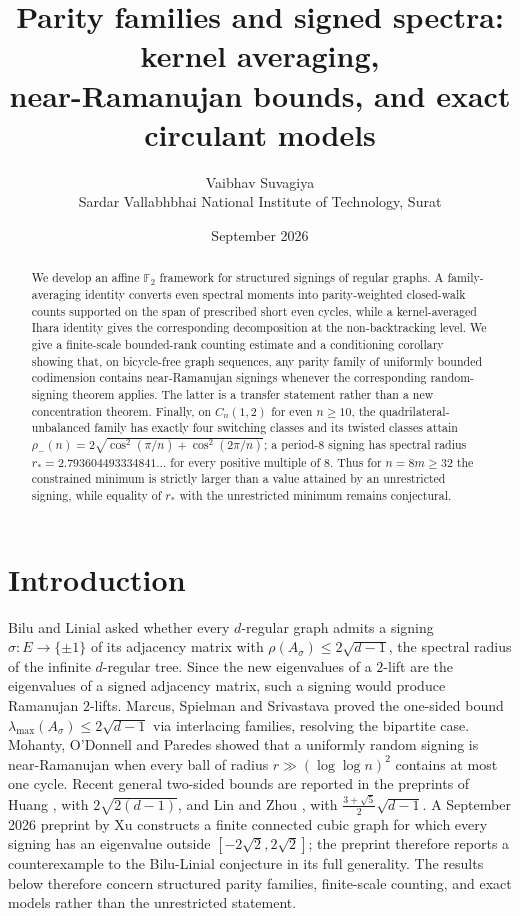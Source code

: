 \documentclass[11pt]{article}
\title{Parity families and signed spectra: kernel averaging,\\ near-Ramanujan bounds, and exact circulant models}
\author{Vaibhav Suvagiya\\
\small Sardar Vallabhbhai National Institute of Technology, Surat}
\date{September 2026}
\theoremstyle{remark}
\begin{document}
\maketitle

\begin{abstract}
We develop an affine $\mathbb F_2$ framework for structured signings of regular graphs.
A family-averaging identity converts even spectral moments into parity-weighted
closed-walk counts supported on the span of prescribed short even cycles, while a
kernel-averaged Ihara identity gives the corresponding decomposition at the
non-backtracking level. We give a finite-scale bounded-rank counting estimate and a
conditioning corollary showing that, on bicycle-free graph sequences, any parity family
of uniformly bounded codimension contains near-Ramanujan signings whenever the
corresponding random-signing theorem applies. The latter is a transfer statement rather
than a new concentration theorem. Finally, on $C_n(1,2)$ for even $n\ge10$, the
quadrilateral-unbalanced family has exactly four switching classes and its twisted
classes attain
$\rho_-(n)=2\sqrt{\cos^2(\pi/n)+\cos^2(2\pi/n)}$; a period-$8$ signing has
spectral radius $r_*=2.793604493334841\ldots$ for every positive multiple of $8$.
Thus for $n=8m\ge32$ the constrained minimum is strictly larger than a value
attained by an unrestricted signing, while equality of $r_*$ with the unrestricted
minimum remains conjectural.
\end{abstract}

\section{Introduction}

Bilu and Linial \cite{bilulinial06} asked whether every $d$-regular
graph admits a signing $\sigma\colon E\to\{\pm1\}$ of its adjacency
matrix with $\rho(A_\sigma)\le2\sqrt{d-1}$, the spectral radius of the
infinite $d$-regular tree. Since the new eigenvalues of a $2$-lift are
the eigenvalues of a signed adjacency matrix, such a signing would
produce Ramanujan $2$-lifts. Marcus, Spielman and Srivastava \cite{mss15}
proved the one-sided bound $\lambda_{\max}(A_\sigma)\le2\sqrt{d-1}$ via
interlacing families, resolving the bipartite case. Mohanty, O'Donnell
and Paredes \cite{mop20} showed that a uniformly random signing is
near-Ramanujan when every ball of radius $r\gg(\log\log n)^2$ contains
at most one cycle. Recent general two-sided bounds are reported in the preprints of Huang
\cite{huang26}, with $2\sqrt{2(d-1)}$, and Lin and Zhou \cite{linzhou26}, with
$\frac{3+\sqrt5}{2}\sqrt{d-1}$. A September 2026 preprint by Xu \cite{xu26counter} constructs a finite connected cubic
graph for which every signing has an eigenvalue outside
$[-2\sqrt2,2\sqrt2]$; the preprint therefore reports a counterexample
to the Bilu-Linial conjecture in its full generality. The results below therefore concern structured parity
families, finite-scale counting, and exact models rather than the unrestricted statement.
\end{document}
